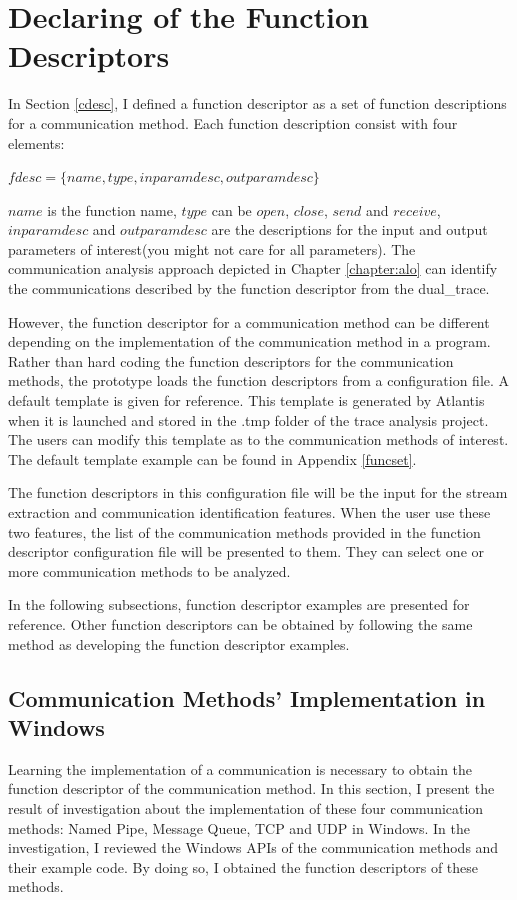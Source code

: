 \section{Declaring of the Function Descriptors}\label{functionset}
In Section \ref{cdesc}, I defined a function descriptor as a set of function descriptions for a communication method. Each function description consist with four elements: 

$fdesc = \lbrace name, type, inparamdesc, outparamdesc \rbrace$

$name$ is the function name, $type$ can be $open$, $close$, $send$ and $receive$, $inparamdesc$ and $outparamdesc$ are the descriptions for the input and output parameters of interest(you might not care for all parameters). The communication analysis approach depicted in Chapter \ref{chapter:alo} can identify the communications described by the function descriptor from the dual\_trace.

However, the function descriptor for a communication method can be different depending on the implementation of the communication method in a program. Rather than hard coding the function descriptors for the communication methods, the prototype loads the function descriptors from a configuration file. A default template is given for reference. This template is generated by Atlantis when it is launched and stored in the .tmp folder of the trace analysis project. The users can modify this template as to the communication methods of interest. The default template example can be found in Appendix \ref{funcset}.

The function descriptors in this configuration file will be the input for the stream extraction and communication identification features. When the user use these two features, the list of the communication methods provided in the function descriptor configuration file will be presented to them. They can select one or more communication methods to be analyzed. 

In the following subsections, function descriptor examples are presented for reference. Other function descriptors can be obtained by following the same method as developing the function descriptor examples.

\subsection{Communication Methods' Implementation in Windows}\label{windows}
Learning the implementation of a communication is necessary to obtain the function descriptor of the communication method. In this section, I present the result of investigation about the implementation of these four communication methods: Named Pipe, Message Queue, TCP and UDP in Windows. In the investigation, I reviewed the Windows APIs of the communication methods and their example code. By doing so, I obtained the function descriptors of these methods. 

